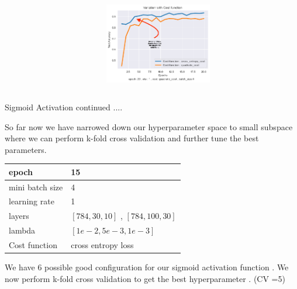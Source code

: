 \documentclass[12pt,t]{beamer}
\begin{document}
\begin{frame}[t]
\begin{columns}
\begin{column}[T]{0.4\linewidth}
        \end{column}
        \begin{column}[T]{0.6\linewidth}
            \includegraphics[width=\linewidth,height=100pt]{sigmoid/cost_variation.png}
        \end{column}
    \end{columns}

\end{frame}

\begin{frame}[t]
    \large Sigmoid Activation continued ....
    
    \scriptsize

    So far now we have narrowed down our hyperparameter space to small subspace where we can perform 
    k-fold cross validation and further tune the best parameters.

    \begin{center}
        \begin{tabular}{ | m{5em} | m{3cm} | } 
            \hline
            epoch & 15 \\ 
            \hline
            mini batch size  & 4 \\ 
            \hline
            learning rate & 1  \\ 
            \hline
            layers  & $[784,30,10]$ , $[784,100,30]$ \\
            \hline
            lambda & $[1e-2,5e-3,1e-3]$ \\
            \hline
            Cost function & cross entropy loss \\
            \hline
          \end{tabular}  
    \end{center}

    We have 6 possible good configuration for our sigmoid activation function . We now perform k-fold cross 
    validation to get the best hyperparameter . (CV =5)

\end{frame}
\end{document}
